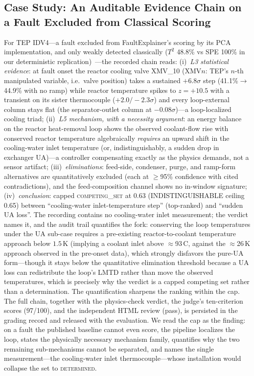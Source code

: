\documentclass[preprint,10pt]{elsarticle}
\begin{document}
\subsection{Case Study: An Auditable Evidence Chain on a Fault Excluded from Classical Scoring}\label{sec:casestudy}
For TEP IDV4---a fault excluded from FaultExplainer's scoring by its PCA implementation, and only weakly detected classically ($T^2$ 48.8\% vs SPE 100\% in our deterministic replication)~\cite{russell2000delay}---the recorded chain reads: (i)~\emph{L3 statistical evidence}: at fault onset the reactor cooling valve XMV\_10 (XMV$n$: TEP's $n$-th manipulated variable, i.e.\ valve position) takes a sustained $+6.8\sigma$ step (41.1\%$\to$44.9\% with no ramp) while reactor temperature spikes to $z{=}{+}10.5$ with a transient on its sister thermocouple ($+2.0/-2.3\sigma$) and every loop-external column stays flat (the separator-outlet column at $-0.08\sigma$)---a loop-localized cooling triad; (ii)~\emph{L5 mechanism, with a necessity argument}: an energy balance on the reactor heat-removal loop shows the observed coolant-flow rise with conserved reactor temperature algebraically \emph{requires} an upward shift in the cooling-water inlet temperature (or, indistinguishably, a sudden drop in exchanger UA)---a controller compensating exactly as the physics demands, not a sensor artifact; (iii)~\emph{eliminations}: feed-side, condenser, purge, and ramp-form alternatives are quantitatively excluded (each at $\ge$95\% confidence with cited contradictions), and the feed-composition channel shows no in-window signature; (iv)~\emph{conclusion}: capped \mbox{\textsc{competing\_set}} at 0.63 (INDISTINGUISHABLE ceiling 0.65) between ``cooling-water inlet-temperature step'' (top-ranked) and ``sudden UA loss''. The recording contains no cooling-water inlet measurement; the verdict names it, and the audit trail quantifies the fork: conserving the loop temperatures under the UA sub-case requires a pre-existing reactor-to-coolant temperature approach below $1.5$\,K (implying a coolant inlet above $\approx$93\,\textdegree C, against the $\approx$26\,K approach observed in the pre-onset data), which strongly disfavors the pure-UA form---though it stays below the quantitative elimination threshold because a UA loss can redistribute the loop's LMTD rather than move the observed temperatures, which is precisely why the verdict is a capped competing set rather than a determination. The quantification sharpens the ranking within the cap. The full chain, together with the physics-check verdict, the judge's ten-criterion scores (97/100), and the independent HTML review (pass), is persisted in the grading record and released with the evaluation. We read the cap as the finding: on a fault the published baseline cannot even score, the pipeline localizes the loop, states the physically necessary mechanism family, quantifies why the two remaining sub-mechanisms cannot be separated, and names the single measurement---the cooling-water inlet thermocouple---whose installation would collapse the set to \mbox{\textsc{determined}}.
\end{document}
